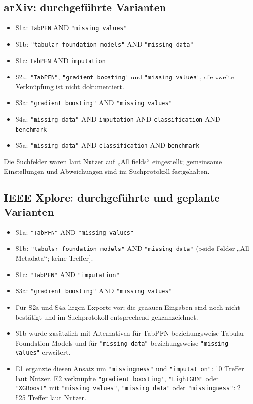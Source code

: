 \documentclass[11pt,a4paper]{article}
\begin{document}
\subsection*{arXiv: durchgeführte Varianten}
\begin{itemize}
  \item S1a: \verb|TabPFN| AND \verb|"missing values"|
  \item S1b: \verb|"tabular foundation models"| AND \verb|"missing data"|
  \item S1c: \verb|TabPFN| AND \verb|imputation|
  \item S2a: \verb|"TabPFN"|, \verb|"gradient boosting"| und
  \verb|"missing values"|; die zweite Verknüpfung ist nicht dokumentiert.
  \item S3a: \verb|"gradient boosting"| AND \verb|"missing values"|
  \item S4a: \verb|"missing data"| AND \verb|imputation| AND
  \verb|classification| AND \verb|benchmark|
  \item S5a: \verb|"missing data"| AND \verb|classification| AND
  \verb|benchmark|
\end{itemize}
Die Suchfelder waren laut Nutzer auf „All fields“ eingestellt; gemeinsame
Einstellungen und Abweichungen sind im Suchprotokoll festgehalten.

\subsection*{IEEE Xplore: durchgeführte und geplante Varianten}
\begin{itemize}
  \item S1a: \verb|"TabPFN"| AND \verb|"missing values"|
  \item S1b: \verb|"tabular foundation models"| AND \verb|"missing data"|
  (beide Felder „All Metadata“; keine Treffer).
  \item S1c: \verb|"TabPFN"| AND \verb|"imputation"|
  \item S3a: \verb|"gradient boosting"| AND \verb|"missing values"|
  \item Für S2a und S4a liegen Exporte vor; die genauen Eingaben sind noch
  nicht bestätigt und im Suchprotokoll entsprechend gekennzeichnet.
  \item S1b wurde zusätzlich mit Alternativen für TabPFN beziehungsweise
  Tabular Foundation Models und für \verb|"missing data"| beziehungsweise
  \verb|"missing values"| erweitert.
  \item E1 ergänzte diesen Ansatz um \verb|"missingness"| und
  \verb|"imputation"|: 10 Treffer laut Nutzer. E2 verknüpfte
  \verb|"gradient boosting"|, \verb|"LightGBM"| oder \verb|"XGBoost"| mit
  \verb|"missing values"|, \verb|"missing data"| oder \verb|"missingness"|:
  2\,525 Treffer laut Nutzer.
\end{itemize}
\end{document}
